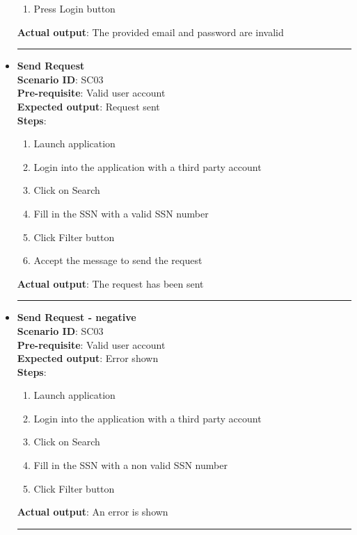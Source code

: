 \documentclass[a4paper, hidelinks, 12pt]{report}
\begin{document}
\begin{itemize}
\begin{enumerate}
			\item{Press Login button}
		\end{enumerate}
		\textbf{Actual output}: The provided email and password are invalid \\
		\rule{\linewidth}{0.4pt}
		\item{\textbf{Send Request}} \\
		\textbf{Scenario ID}: SC03 \\
		\textbf{Pre-requisite}: Valid user account \\
		\textbf{Expected output}: Request sent\\
		\textbf{Steps}:
		\begin{enumerate}
			\item{Launch application}
			\item{Login into the application with a third party account}
			\item{Click on Search}
			\item{Fill in the SSN with a valid SSN number}
			\item{Click Filter button}
			\item{Accept the message to send the request}
		\end{enumerate}
		\textbf{Actual output}: The request has been sent\\
		\rule{\linewidth}{0.4pt}
		
		\item{\textbf{Send Request - negative}} \\
		\textbf{Scenario ID}: SC03 \\
		\textbf{Pre-requisite}: Valid user account \\
		\textbf{Expected output}: Error shown\\
		\textbf{Steps}:
		\begin{enumerate}
			\item{Launch application}
			\item{Login into the application with a third party account}
			\item{Click on Search}
			\item{Fill in the SSN with a non valid SSN number}
			\item{Click Filter button}
		\end{enumerate}
		\textbf{Actual output}: An error is shown\\
		\rule{\linewidth}{0.4pt}
		

\end{itemize}
\end{document}
